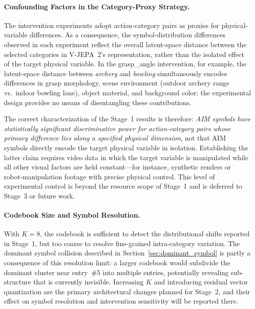 \documentclass{article}
\begin{document}
\paragraph{Confounding Factors in the Category-Proxy Strategy.}
The intervention experiments adopt action-category pairs as proxies for
physical-variable differences.  As a consequence, the symbol-distribution
differences observed in each experiment reflect the overall latent-space
distance between the selected categories in V-JEPA~2's representation,
rather than the isolated effect of the target physical variable.  In the
grasp\_angle intervention, for example, the latent-space distance between
\textit{archery} and \textit{bowling} simultaneously encodes differences
in grasp morphology, scene environment (outdoor archery range vs.\ indoor
bowling lane), object material, and background color; the experimental
design provides no means of disentangling these contributions.

The correct characterization of the Stage~1 results is therefore:
\emph{AIM symbols have statistically significant discriminative power for
action-category pairs whose primary difference lies along a specified
physical dimension}, not that AIM symbols directly encode the target
physical variable in isolation.  Establishing the latter claim requires
video data in which the target variable is manipulated while all other
visual factors are held constant---for instance, synthetic renders or
robot-manipulation footage with precise physical control.  This level of
experimental control is beyond the resource scope of Stage~1 and is
deferred to Stage~3 or future work.

\paragraph{Codebook Size and Symbol Resolution.}
With $K = 8$, the codebook is sufficient to detect the distributional
shifts reported in Stage~1, but too coarse to resolve fine-grained
intra-category variation.  The dominant symbol collision described in
Section~\ref{sec:dominant_symbol} is partly a consequence of this resolution limit: a larger
codebook would subdivide the dominant cluster near entry~\#5 into
multiple entries, potentially revealing sub-structure that is currently
invisible.  Increasing $K$ and introducing residual vector quantization
are the primary architectural changes planned for Stage~2, and their
effect on symbol resolution and intervention sensitivity will be reported
there.

\newpage 


 

\end{document}
